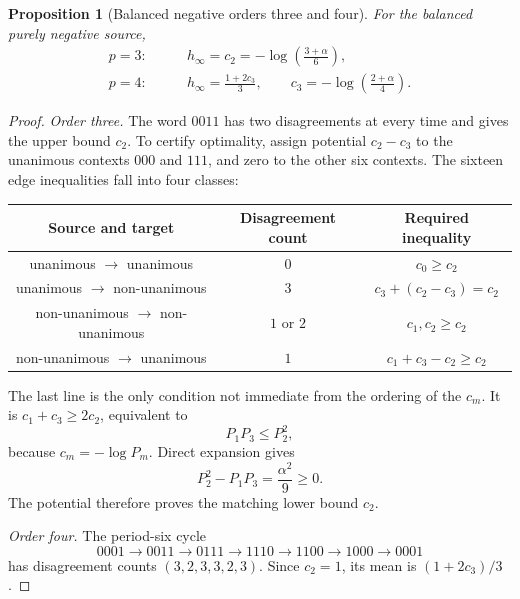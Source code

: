 \documentclass[11pt,a4paper]{article}
\newtheorem{proposition}[theorem]{Proposition}
\begin{document}
\begin{proposition}[Balanced negative orders three and four]
\label{prop:negative_three_four}
For the balanced purely negative source,
\begin{align}
    p=3:&\qquad
    h_\infty=c_2
    =-\log\left(\frac{3+\alpha}{6}\right),
    \label{eq:negative_order_three}\\
    p=4:&\qquad
    h_\infty=\frac{1+2c_3}{3},
    \qquad
    c_3=-\log\left(\frac{2+\alpha}{4}\right).
    \label{eq:negative_order_four}
\end{align}
\end{proposition}

\begin{proof}
\textit{Order three.}
The word $0011$ has two disagreements at every time and gives
the upper bound $c_2$.
To certify optimality, assign potential $c_2-c_3$ to the unanimous
contexts $000$ and $111$, and zero to the other six contexts.
The sixteen edge inequalities fall into four classes:
\begin{center}
\small
\begin{tabular}{ccc}
\toprule
Source and target & Disagreement count & Required inequality\\
\midrule
unanimous $\to$ unanimous & $0$ & $c_0\ge c_2$\\
unanimous $\to$ non-unanimous & $3$ & $c_3+(c_2-c_3)=c_2$\\
non-unanimous $\to$ non-unanimous & $1$ or $2$ & $c_1,c_2\ge c_2$\\
non-unanimous $\to$ unanimous & $1$ & $c_1+c_3-c_2\ge c_2$\\
\bottomrule
\end{tabular}
\end{center}
The last line is the only condition not immediate from the ordering of
the $c_m$.  It is
$c_1+c_3\ge2c_2$, equivalent to
\[
    P_1P_3\le P_2^2,
\]
because $c_m=-\log P_m$.  Direct expansion gives
\[
    P_2^2-P_1P_3=\frac{\alpha^2}{9}\ge0.
\]
The potential therefore proves the matching lower bound $c_2$.

\textit{Order four.}
The period-six cycle
\[
0001\to0011\to0111\to1110\to1100\to1000\to0001
\]
has disagreement counts $(3,2,3,3,2,3)$.  Since $c_2=1$, its mean is
$(1+2c_3)/3$.


\end{proof}
\end{document}
